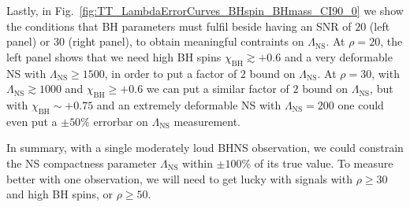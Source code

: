 \documentclass[aps,prd,amsmath,floats,floatfix, twocolumn,
superscriptaddress,nofootinbib,showpacs]{revtex4-1}
\newcommand{\lambdans}{\Lambda_\mathrm{NS}}
\newcommand{\chibh}{\chi_\mathrm{BH}}
\begin{document}
Lastly, in Fig.~\ref{fig:TT_LambdaErrorCurves_BHspin_BHmass_CI90_0} we show the
conditions that BH parameters must fulfil beside having an SNR of $20$ (left 
panel) or $30$ (right panel), to obtain meaningful contraints on $\lambdans$.
At $\rho=20$, the left panel shows that we need high BH spins 
$\chibh\gtrsim +0.6$ and a very deformable NS with $\lambdans\geq 1500$, in 
order to put a factor of $2$ bound on $\lambdans$. At $\rho=30$, with
$\lambdans\gtrsim 1000$ and $\chibh\geq+0.6$ we can put a similar factor of
$2$ bound on $\lambdans$, but with $\chibh\sim+0.75$ and an extremely deformable
NS with $\lambdans=200$ one could even put a $\pm 50\%$ errorbar on 
$\lambdans$ measurement.




In summary, with a single moderately loud BHNS observation, we could constrain
the NS compactness parameter $\lambdans$ within $\pm 100\%$ of its true value.
To measure better with one observation, we will need to get lucky with signals
with $\rho\geq 30$ and high BH spins, or $\rho\geq 50$.



\end{document}

